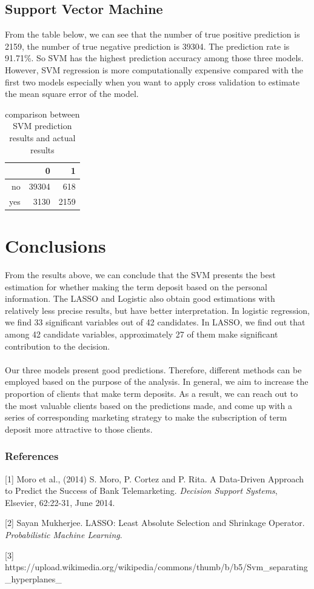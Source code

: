 \documentclass{article} %
\begin{document}
\subsection{Support Vector Machine}
From the table below, we can see that the number of true positive prediction is 2159, the number of true negative prediction is 39304. The prediction rate is 91.71\%. So SVM has the highest prediction accuracy among those three models. However, SVM regression is more computationally expensive compared with the first two models especially when you want to apply cross validation to estimate the mean square error of the model.
\begin{table}[ht]
\caption{comparison between SVM prediction results and actual results}
\centering
\begin{tabular}{rrr}
  \hline
 & 0 & 1 \\ 
  \hline
no & 39304 & 618 \\ 
  yes & 3130 & 2159 \\ 
   \hline
\end{tabular}
\end{table}


\section{Conclusions}
From the results above, we can conclude that the SVM presents the best estimation for whether making the term deposit based on the personal information. The LASSO and Logistic also obtain good estimations with relatively less precise results, but have better interpretation. In logistic regression, we find 33 significant variables out of 42 candidates. In LASSO, we find out that among 42 candidate variables, approximately 27 of them make significant contribution to the decision. \\\\
Our three models present good predictions. Therefore, different methods can be employed based on the purpose of the analysis. In general, we aim to increase the proportion of clients that make term deposits. As a result, we can reach out to the most valuable clients based on the predictions made, and come up with a series of corresponding marketing strategy to make the subscription of term deposit more attractive to those clients.



\subsubsection*{References}
\small{
[1] Moro et al., (2014) S. Moro, P. Cortez and P. Rita. A Data-Driven Approach to Predict the Success of Bank Telemarketing. {\it Decision Support Systems}, Elsevier, 62:22-31, June 2014.

[2] Sayan Mukherjee. LASSO: Least Absolute Selection and Shrinkage Operator. {\it Probabilistic Machine Learning}.

[3] https://upload.wikimedia.org/wikipedia/commons/thumb/b/b5/Svm\_separating\_hyperplanes\_%
}
\end{document}

